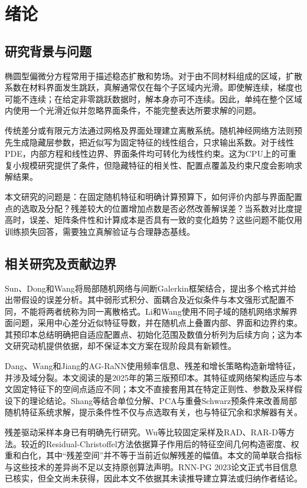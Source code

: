 \chapter{绪论}
\section{研究背景与问题}
椭圆型偏微分方程常用于描述稳态扩散和势场。对于由不同材料组成的区域，扩散系数在材料界面发生跳跃，真解通常仅在每个子区域内光滑。即使解连续，梯度也可能不连续；在给定非零跳跃数据时，解本身亦可不连续。因此，单纯在整个区域内使用一个光滑近似并忽略界面条件，不能完整表达所要求解的问题。

传统差分或有限元方法通过网格及界面处理建立离散系统。随机神经网络方法则预先生成隐藏层参数，把近似写为固定特征的线性组合，只求输出系数。对于线性PDE，内部方程和线性边界、界面条件均可转化为线性约束。这为CPU上的可重复小规模研究提供了条件，但隐藏特征的相关性、配置点覆盖及约束尺度会影响求解结果。

本文研究的问题是：在固定随机特征和明确计算预算下，如何评价内部与界面配置点的选取及分配？残差较大的位置增加点数是否必然改善解误差？当系数对比度提高时，误差、矩阵条件性和计算成本是否具有一致的变化趋势？这些问题不能仅用训练损失回答，需要独立真解验证与合理静态基线。

\section{相关研究及贡献边界}
Sun、Dong和Wang将局部随机网络与间断Galerkin框架结合，提出多个格式并给出带假设的误差分析\cite{dgpreprint}。其中弱形式积分、面耦合及近似条件与本文强形式配置不同，不能将两者统称为同一离散格式。Li和Wang使用不同子域的随机网络求解界面问题，采用中心差分近似特征导数，并在随机点上叠置内部、界面和边界约束\cite{interfacepreprint}。其预印本总结明确把自适应配置点、初始化范围及数值分析列为后续方向；这为本文研究动机提供依据，却不保证本文方案在现阶段具有新颖性。

Dang、Wang和Jiang的AG-RaNN使用频率信息、残差和增长策略构造新增特征，并涉及域分裂\cite{ag}。本文阅读的是2025年的第三版预印本。其特征或网络架构适应与本文固定特征下的空间点适应不同；本文不直接套用其在特定正则性、参数及采样假设下的理论结论。Shang等结合单位分解、PCA与重叠Schwarz预条件来改善局部随机特征系统求解\cite{schwarzpreprint}，提示条件性不仅与点选取有关，也与特征冗余和求解器有关。

残差驱动采样本身已有明确先行研究。Wu等比较固定采样及RAD、RAR-D等方法\cite{rar}。较近的Residual-Christoffel方法依据算子作用后的特征空间几何构造密度、权重和白化\cite{christoffel}，其中“残差空间”并不等于当前近似解残差的幅值。本文的简单联合指标与这些技术的差异尚不足以支持原创算法声明。RNN-PG 2023论文正式书目信息已核实\cite{pg}，但全文尚未获得，因此本文不依据其未读推导建立算法或归纳作者结论。

